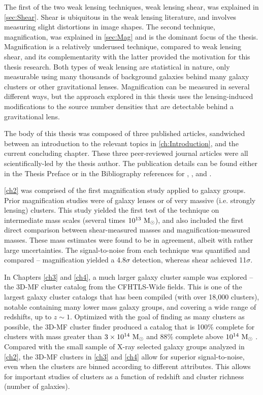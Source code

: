 The first of the two weak lensing techniques, weak lensing shear, was explained in \autoref{sec:Shear}. Shear is ubiquitous in the weak lensing literature, and involves measuring slight distortions in image shapes. The second technique, magnification, was explained in \autoref{sec:Mag} and is the dominant focus of the thesis. Magnification is a relatively underused technique, compared to weak lensing shear, and its complementarity with the latter provided the motivation for this thesis research. Both types of weak lensing are statistical in nature, only measurable using many thousands of background galaxies behind many galaxy clusters or other gravitational lenses.  Magnification can be measured in several different ways, but the approach explored in this thesis uses the lensing-induced modifications to the source number densities that are detectable behind a gravitational lens.

The body of this thesis was composed of three published articles, sandwiched between an introduction to the relevant topics in \autoref{ch:Introduction}, and the current concluding chapter. These three peer-reviewed journal articles were all scientifically-led by the thesis author. The publication details can be found either in the Thesis Preface or in the Bibliography references for \citet{Ford12}, \citet{Ford14}, and \citet{Ford15}. 

\autoref{ch2} was comprised of the first magnification study applied to galaxy groups. Prior magnification studies were of galaxy lenses or of very massive (i.e. strongly lensing) clusters. This study yielded the first test of the technique on intermediate mass scales (several times $10^{13}\ {\rm M}_{\odot}$), and also included the first direct comparison between shear-measured masses and magnification-measured masses. These mass estimates were found to be in agreement, albeit with rather large uncertainties. The signal-to-noise from each technique was quantified and compared -- magnification yielded a 4.8$\sigma$ detection, whereas shear achieved 11$\sigma$.

In Chapters \ref{ch3} and \ref{ch4}, a much larger galaxy cluster sample was explored -- the \ac{3D-MF} cluster catalog from the \ac{CFHTLS}-Wide fields. This is one of the largest galaxy cluster catalogs that has been compiled (with over 18,000 clusters), notable containing many lower mass galaxy groups, and covering a wide range of redshifts, up to $z \sim 1$. Optimized with the goal of finding as many clusters as possible, the \ac{3D-MF} cluster finder produced a catalog that is 100\% complete for clusters with mass greater than $3 \times 10^{14}\ {\rm M}_{\odot}$ and 88\% complete above $10^{14}\ {\rm M}_{\odot}$ \citep[see \autoref{sec:3DMF4} or the original \ac{3D-MF} paper][for more details]{Milkeraitis10}. Compared with the small sample of X-ray selected galaxy groups analyzed in \autoref{ch2}, the \ac{3D-MF} clusters in \autoref{ch3} and \autoref{ch4} allow for superior signal-to-noise, even when the clusters are binned according to different attributes. This allows for important studies of clusters as a function of redshift and cluster richness (number of galaxies).

